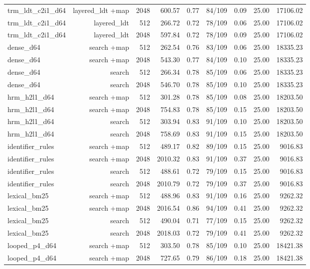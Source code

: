 \begin{table}[t]
\begin{adjustbox}{max width=\linewidth}
\begin{tabular}{lrrrrrrrr}
trm\_ldt\_c2i1\_d64 & layered\_ldt +map & 2048 & 600.57 & 0.77 & 84/109 & 0.09 & 25.00 & 17106.02 \\
trm\_ldt\_c2i1\_d64 & layered\_ldt & 512 & 266.72 & 0.72 & 78/109 & 0.06 & 25.00 & 17106.02 \\
trm\_ldt\_c2i1\_d64 & layered\_ldt & 2048 & 597.84 & 0.72 & 78/109 & 0.09 & 25.00 & 17106.02 \\
dense\_d64 & search +map & 512 & 262.54 & 0.76 & 83/109 & 0.06 & 25.00 & 18335.23 \\
dense\_d64 & search +map & 2048 & 543.30 & 0.77 & 84/109 & 0.10 & 25.00 & 18335.23 \\
dense\_d64 & search & 512 & 266.34 & 0.78 & 85/109 & 0.06 & 25.00 & 18335.23 \\
dense\_d64 & search & 2048 & 546.70 & 0.78 & 85/109 & 0.10 & 25.00 & 18335.23 \\
hrm\_h2l1\_d64 & search +map & 512 & 301.28 & 0.78 & 85/109 & 0.08 & 25.00 & 18203.50 \\
hrm\_h2l1\_d64 & search +map & 2048 & 754.83 & 0.78 & 85/109 & 0.15 & 25.00 & 18203.50 \\
hrm\_h2l1\_d64 & search & 512 & 303.94 & 0.83 & 91/109 & 0.10 & 25.00 & 18203.50 \\
hrm\_h2l1\_d64 & search & 2048 & 758.69 & 0.83 & 91/109 & 0.15 & 25.00 & 18203.50 \\
identifier\_rules & search +map & 512 & 489.17 & 0.82 & 89/109 & 0.15 & 25.00 & 9016.83 \\
identifier\_rules & search +map & 2048 & 2010.32 & 0.83 & 91/109 & 0.37 & 25.00 & 9016.83 \\
identifier\_rules & search & 512 & 488.61 & 0.72 & 79/109 & 0.15 & 25.00 & 9016.83 \\
identifier\_rules & search & 2048 & 2010.79 & 0.72 & 79/109 & 0.37 & 25.00 & 9016.83 \\
lexical\_bm25 & search +map & 512 & 488.96 & 0.83 & 91/109 & 0.16 & 25.00 & 9262.32 \\
lexical\_bm25 & search +map & 2048 & 2016.54 & 0.86 & 94/109 & 0.41 & 25.00 & 9262.32 \\
lexical\_bm25 & search & 512 & 490.04 & 0.71 & 77/109 & 0.15 & 25.00 & 9262.32 \\
lexical\_bm25 & search & 2048 & 2018.03 & 0.72 & 79/109 & 0.41 & 25.00 & 9262.32 \\
looped\_p4\_d64 & search +map & 512 & 303.50 & 0.78 & 85/109 & 0.10 & 25.00 & 18421.38 \\
looped\_p4\_d64 & search +map & 2048 & 727.65 & 0.79 & 86/109 & 0.18 & 25.00 & 18421.38 \\

\end{tabular}
\end{adjustbox}
\end{table}
